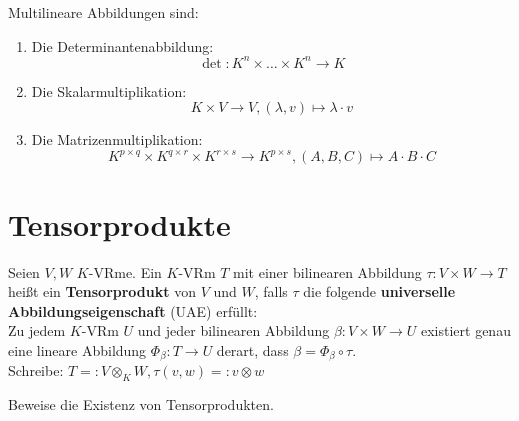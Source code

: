 \documentclass[parskip,a4paper,twoside,DIV15,BCOR12mm]{scrbook}
\begin{document}
\begin{example}
Multilineare Abbildungen sind:
\begin{enumerate}
\item Die Determinantenabbildung:
\[\det:K^n\times\ldots\times K^n\to K\]
\item Die Skalarmultiplikation:
\[K\times V\to V,(\lambda,v)\mapsto \lambda\cdot v\]
\item Die Matrizenmultiplikation:
\[K^{p\times q}\times K^{q\times r}\times K^{r\times s}\to K^{p\times s},(A,B,C)\mapsto A\cdot B\cdot C\]
\end{enumerate}
\end{example}

\section{Tensorprodukte}
\begin{definition}
Seien $V,W$ $K$-VRme. Ein $K$-VRm $T$ mit einer bilinearen Abbildung $\tau:V\times W\to T$
heißt ein \textbf{Tensorprodukt} von $V$ und $W$, falls $\tau$ die folgende 
\textbf{universelle Abbildungseigenschaft} (UAE) erfüllt:\\
Zu jedem $K$-VRm $U$ und jeder bilinearen Abbildung $\beta:V\times W\to U$ existiert
genau eine lineare Abbildung $\Phi_\beta:T\to U$ derart, dass $\beta=\Phi_\beta\circ \tau$.\\
Schreibe: $T=:V\otimes_K W,\tau(v,w)=:v\otimes w$
\end{definition}

\begin{comment}
\begin{enumerate}
\item Falls $T$ existiert, so hat man eine Bijektion:
\[\Bil(V\times W,U)\stackrel{\sim}{\to}\Hom(T,U),\beta\mapsto\Phi_\beta\]
\item Sind $(T_1,\tau_1),(T_2,\tau_2)$ Tensorprodukte von $V$ und $W$, so existiert genau 
ein Isomorphismus $\Phi:T_1\to T_2$ mit $\tau_2=\Phi\circ\tau_1$.
\end{enumerate}
\end{comment}

\begin{task}
Beweise die Existenz von Tensorprodukten.
\end{task}
\end{document}

